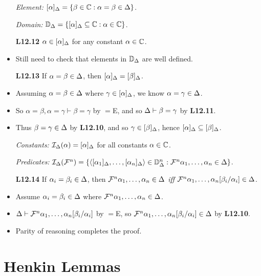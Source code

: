 \documentclass[a4paper, 11pt]{article} %
\begin{document}
\begin{itemize}
  \item[\it Element:] $[\alpha]_{\Delta}=\lbrace\beta\in\mathbb{C} : \alpha=\beta\in\Delta\rbrace$.
  \item[\it Domain:] $\mathbb{D}_{\Delta}=\lbrace[\alpha]_{\Delta} \subseteq \mathbb{C} : \alpha\in\mathbb{C}\rbrace$.
  \item[\bf L12.12] $\alpha\in[\alpha]_{\Delta}$ for any constant $\alpha\in\mathbb{C}$.
    \item Still need to check that elements in $\mathbb{D}_{\Delta}$ are well defined. 
  \item[\bf L12.13] If $\alpha=\beta\in\Delta$, then $[\alpha]_{\Delta}=[\beta]_{\Delta}$.
  \item Assuming $\alpha=\beta\in\Delta$ where $\gamma\in[\alpha]_{\Delta}$, we know $\alpha=\gamma\in\Delta$.
  \item So $\alpha=\beta,\alpha=\gamma\vdash\beta=\gamma$ by $=$E, and so $\Delta\vdash\beta=\gamma$ by \textbf{L12.11}.
  \item Thus $\beta=\gamma\in\Delta$ by \textbf{L12.10}, and so $\gamma\in[\beta]_{\Delta}$, hence $[\alpha]_{\Delta}\subseteq[\beta]_{\Delta}$.
  \item[\it Constants:] $\mathcal{I}_{\Delta}(\alpha)=[\alpha]_{\Delta}$ for all constants $\alpha\in\mathbb{C}$.
  \item[\it Predicates:] $\mathcal{I}_{\Delta}(\mathcal{F}^n)=\lbrace\langle[\alpha_1]_{\Delta},\ldots,[\alpha_n]_{\Delta}\rangle\in\mathbb{D}_{\Delta}^n:\mathcal{F}^n\alpha_1,\ldots,\alpha_n\in\Delta\rbrace$.
  \item[\bf L12.14] If $\alpha_i=\beta_i\in\Delta$, then $\mathcal{F}^n\alpha_1,\ldots,\alpha_n\in\Delta$ \textit{iff} $\mathcal{F}^n\alpha_1,\ldots,\alpha_n[\beta_i/\alpha_i]\in\Delta$.
    \setcounter{enumi}{0}
  \item Assume $\alpha_i=\beta_i\in\Delta$ where $\mathcal{F}^n\alpha_1,\ldots,\alpha_n\in\Delta$.
  \item $\Delta\vdash\mathcal{F}^n\alpha_1,\ldots,\alpha_n[\beta_i/\alpha_i]$ by $=$E, so $\mathcal{F}^n\alpha_1,\ldots,\alpha_n[\beta_i/\alpha_i]\in\Delta$ by \textbf{L12.10}.
  \item Parity of reasoning completes the proof.
\end{itemize}




\section*{Henkin Lemmas}
\end{document}
